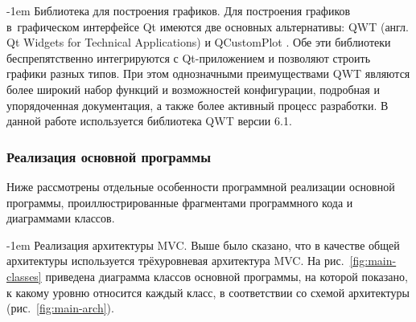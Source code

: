 \documentclass[a4paper, 14pt, titlepage]{extarticle}
\makeatletter
\newcommand{\eng}[1]{\foreignlanguage{english}{#1}}
\renewcommand{\paragraph}{%
    \@startsection{paragraph}{4}%
    {\parindent}{\z@}{-1em}%
    {\normalfont\normalsize\bfseries}%
  }
\makeatother
\begin{document}
  \paragraph{Библиотека для построения графиков.}
  Для построения графиков в~графическом интерфейсе Qt имеются две основных альтернативы: QWT (англ.
  \eng{Qt Widgets for Technical Applications}) \cite{qwt} и QCustomPlot \cite{qcustomplot}.  Обе эти
  библиотеки беспрепятственно интегрируются с Qt-приложением и позволяют строить графики разных
  типов. При этом однозначными преимуществами QWT являются более широкий набор функций и
  возможностей конфигурации, подробная и упорядоченная документация, а также более активный процесс разработки.
  В данной работе используется библиотека QWT версии 6.1.

  \subsubsection{Реализация основной программы}\label{sssec:main-impl}

  Ниже рассмотрены отдельные особенности программной реализации основной программы,
  проиллюстрированные фрагментами программного кода и диаграммами классов.

  \paragraph{Реализация архитектуры MVC.}
  Выше было сказано, что в качестве общей архитектуры используется трёхуровневая архитектура MVC. На
  рис.~\ref{fig:main-classes} приведена диаграмма классов основной программы, на которой показано, к
  какому уровню относится каждый класс, в соответствии со схемой архитектуры (рис.~\ref{fig:main-arch}).
\end{document}
